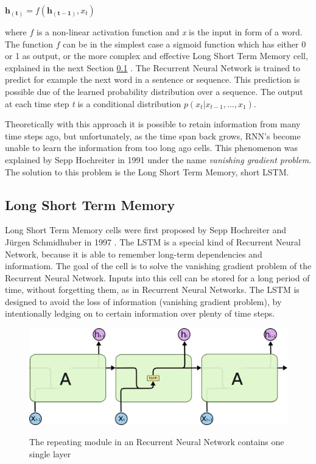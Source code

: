 \begin{center}
\begin{math}
\boldsymbol{h_{(t)}} = f(\boldsymbol{h_{(t-1)}}, x_{t})
\end{math}
\end{center}

where \(f\) is a non-linear activation function and \textit{x} is the input in form of a word. The function \(f\) can be in the simplest case a sigmoid function which has either 0 or 1 as output, or the more complex and effective Long Short Term Memory cell, explained in the next Section \ref{ss:lstm} \cite{hochreiter1997long}. The Recurrent Neural Network is trained to predict for example the next word in a sentence or sequence. This prediction is possible due of the learned probability distribution over a sequence. The output at each time step \textit{t} is a conditional distribution \(p(x_{t}|x_{t-1},...,x_{1})\).

Theoretically with this approach it is possible to retain information from many time steps ago, but unfortunately, as the time span back grows, RNN's become unable to learn the information from too long ago cells. This phenomenon was explained by Sepp Hochreiter in 1991 \cite{Hochreiter:91} under the name \textit{vanishing gradient problem}. The solution to this problem is the Long Short Term Memory, short LSTM.

\subsection{Long Short Term Memory}\label{ss:lstm}
Long Short Term Memory cells were first proposed by Sepp Hochreiter and Jürgen Schmidhuber in 1997 \cite{hochreiter1997long}. The LSTM is a special kind of Recurrent Neural Network, because it is able to remember long-term dependencies and informatiom. The goal of the cell is to solve the vanishing gradient problem of the Recurrent Neural Network. Inputs into this cell can be stored for a long period of time, without forgetting them, as in Recurrent Neural Networks. The LSTM is designed to avoid the loss of information (vanishing gradient problem), by intentionally ledging on to certain information over plenty of time steps. 

\begin{figure}
	\begin{center}
		\includegraphics[width=4.5in]{photos/LSTM3-SimpleRNN}\\
		\caption{The repeating module in an Recurrent Neural Network contains one single layer \cite{olah}}\label{lstm}
	\end{center}
\end{figure}

